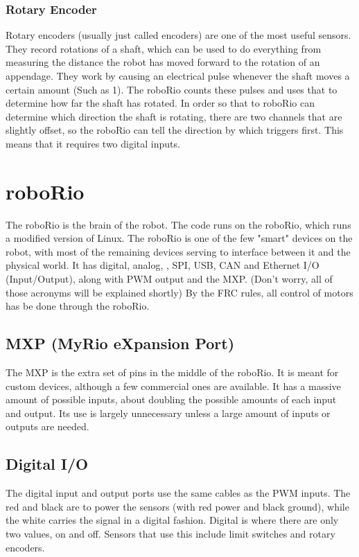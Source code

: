 \documentclass[]{report}
\begin{document}
	\subsubsection{Rotary Encoder}
		Rotary encoders (usually just called encoders) are one of the most useful sensors.
		They record rotations of a shaft, which can be used to do everything from measuring the distance the robot has moved forward to the rotation of an appendage.
		They work by causing an electrical pulse whenever the shaft moves a certain amount (Such as 1\textdegree).
		The roboRio counts these pulses and uses that to determine how far the shaft has rotated.
		In order so that to roboRio can determine which direction the shaft is rotating, there are two channels that are slightly offset, so the roboRio can tell the direction by which triggers first.
		This means that it requires two digital inputs.
\section{roboRio}
	The roboRio is the brain of the robot.
	The code runs on the roboRio, which runs a modified version of Linux.
	The roboRio is one of the few "smart" devices on the robot, with most of the remaining devices serving to interface between it and the physical world.
	It has digital, analog, \ITwoC, SPI, USB, CAN and Ethernet I/O (Input/Output), along with PWM output and the MXP. (Don't worry, all of those acronyms will be explained shortly)
	By the FRC rules, all control of motors has be done through the roboRio.
	
\subsection{MXP (MyRio eXpansion Port)}
	The MXP is the extra set of pins in the middle of the roboRio.
	It is meant for custom devices, although a few commercial ones are available.
	It has a massive amount of possible inputs, about doubling the possible amounts of each input and output.
	Its use is largely unnecessary unless a large amount of inputs or outputs are needed.

\subsection{Digital I/O}
	The digital input and output ports use the same cables as the PWM inputs.
	The red and black are to power the sensors (with red power and black ground), while the white carries the signal in a digital fashion.
	Digital is where there are only two values, on and off.
	Sensors that use this include limit switches and rotary encoders.
\end{document}
